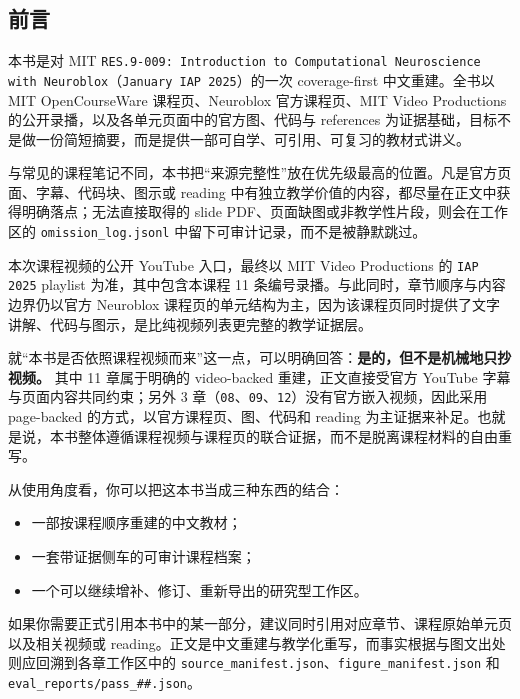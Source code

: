 \subsection*{前言}
本书是对 MIT \texttt{RES.9-009: Introduction to Computational Neuroscience with Neuroblox}（\texttt{January IAP 2025}）的一次 coverage-first 中文重建。全书以 MIT OpenCourseWare 课程页、Neuroblox 官方课程页、MIT Video Productions 的公开录播，以及各单元页面中的官方图、代码与 references 为证据基础，目标不是做一份简短摘要，而是提供一部可自学、可引用、可复习的教材式讲义。

与常见的课程笔记不同，本书把“来源完整性”放在优先级最高的位置。凡是官方页面、字幕、代码块、图示或 reading 中有独立教学价值的内容，都尽量在正文中获得明确落点；无法直接取得的 slide PDF、页面缺图或非教学性片段，则会在工作区的 \texttt{omission\_log.jsonl} 中留下可审计记录，而不是被静默跳过。

本次课程视频的公开 YouTube 入口，最终以 MIT Video Productions 的 \texttt{IAP 2025} playlist 为准，其中包含本课程 11 条编号录播。与此同时，章节顺序与内容边界仍以官方 Neuroblox 课程页的单元结构为主，因为该课程页同时提供了文字讲解、代码与图示，是比纯视频列表更完整的教学证据层。

就“本书是否依照课程视频而来”这一点，可以明确回答：\textbf{是的，但不是机械地只抄视频。} 其中 11 章属于明确的 video-backed 重建，正文直接受官方 YouTube 字幕与页面内容共同约束；另外 3 章（\texttt{08}、\texttt{09}、\texttt{12}）没有官方嵌入视频，因此采用 page-backed 的方式，以官方课程页、图、代码和 reading 为主证据来补足。也就是说，本书整体遵循课程视频与课程页的联合证据，而不是脱离课程材料的自由重写。

从使用角度看，你可以把这本书当成三种东西的结合：
\begin{itemize}
    \item 一部按课程顺序重建的中文教材；
    \item 一套带证据侧车的可审计课程档案；
    \item 一个可以继续增补、修订、重新导出的研究型工作区。
\end{itemize}

如果你需要正式引用本书中的某一部分，建议同时引用对应章节、课程原始单元页以及相关视频或 reading。正文是中文重建与教学化重写，而事实根据与图文出处则应回溯到各章工作区中的 \texttt{source\_manifest.json}、\texttt{figure\_manifest.json} 和 \texttt{eval\_reports/pass\_\#\#.json}。
